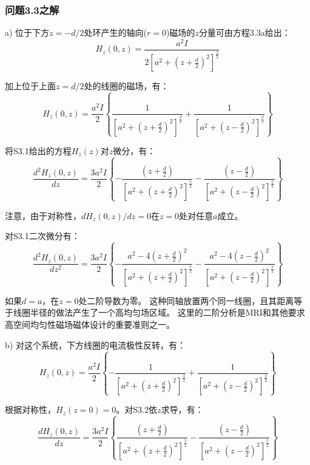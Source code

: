 \subsubsection{问题3.3之解}
a) 位于下方$z=−d/2$处环产生的轴向($r =0$)磁场的$z$分量可由方程3.3a给出：
\begin{equation*}%
H_z(0,z)=\frac{a^2I}{2[a^2+(z+\frac{d}{2})^2]^\frac{3}{2}}
\end{equation*}

加上位于上面$z=d/2$处的线圈的磁场，有：
\begin{equation*}%
H_z(0,z)=\frac{a^2I}{2}\left\{\frac{1}{[a^2+(z+\frac{d}{2})^2]^\frac{3}{2}}+\frac{1}{[a^2+(z-\frac{d}{2})^2]^\frac{3}{2}}\right\} \tag{S3.1}
\end{equation*}

将S3.1给出的方程$H_z(z)$对$z$微分，有：
\begin{equation*}
\frac{d^2H_z(0,z)}{dz}=\frac{3a^2I}{2}\left\{{-\frac{(z+\frac{d}{2})}{[a^2+(z+\frac{d}{2})^2]^\frac{5}{2}}-\frac{(z-\frac{d}{2})}{[a^2+(z-\frac{d}{2})^2]^\frac{5}{2}}}\right\}
\end{equation*}

注意，由于对称性，$dH_z(0,z)/dz=0$在$z=0$处对任意$a$成立。

对S3.1二次微分有：
\begin{equation*}
\frac{d^2H_z(0,z)}{dz^2}=\frac{3a^2I}{2}\left\{{-\frac{a^2-4(z+\frac{d}{2})^2}{[a^2+(z+\frac{d}{2})^2]^\frac{7}{2}}}
-\frac{a^2-4(z-\frac{d}{2})^2}{[a^2+(z-\frac{d}{2})^2]^\frac{7}{2}}\right\}
\end{equation*}

如果$d = a$，在$z = 0$处二阶导数为零。
这种同轴放置两个同一线圈，且其距离等于线圈半径的做法产生了一个高均匀场区域。
这里的二阶分析是MRI和其他要求高空间均匀性磁场磁体设计的重要准则之一。

b) 对这个系统，下方线圈的电流极性反转，有：
\begin{equation*}%
H_z(0,z)=\frac{a^2I}{2}\left\{{-\frac{1}{[a^2+(z+\frac{d}{2})^2]^\frac{3}{2}}+\frac{1}{[a^2+(z-\frac{d}{2})^2]^\frac{3}{2}}}\right\} \tag{S3.2}
\end{equation*}

根据对称性，$H_z(z=0)=0$。对S3.2依$z$求导，有：
\begin{equation*}%
\frac{dH_z(0,z)}{dz}=\frac{3a^2I}{2}\left\{{\frac{(z+\frac{d}{2})}{[a^2+(z+\frac{d}{2})^2]^\frac{5}{2}}-\frac{(z-\frac{d}{2})}{[a^2+(z-\frac{d}{2})^2]^\frac{5}{2}}}\right\} \tag{S3.3}
\end{equation*}

